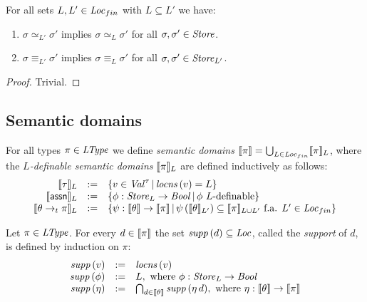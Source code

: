 \documentclass[12pt,a4paper]{report}
\begin{document}
\begin{lemma}
  For all sets $L,L'\in\mathit{Loc}_{fin}$ with $L \subseteq L'$ we have:
  \begin{enumerate}
    \item $\sigma \simeq_{L'} \sigma'$ implies $\sigma \simeq_L \sigma'$ for all $\sigma,\sigma'\in\mathit{Store}$.
    \item $\sigma \equiv_{L'} \sigma'$ implies $\sigma \equiv_L \sigma'$ for all $\sigma,\sigma'\in\mathit{Store}_{L'}$.
  \end{enumerate}
\end{lemma}

\begin{proof}
  Trivial.
\end{proof}



\subsection{Semantic domains}

\begin{definition}
  For all types $\pi \in \mathit{LType}$ we define {\em semantic domains}
  $\llbracket\pi\rrbracket = \bigcup_{L\in\mathit{Loc}_{fin}} \llbracket\pi\rrbracket_L$, where
  the {\em $L$-definable semantic domains} $\llbracket\pi\rrbracket_L$ are defined inductively as follows:
  \[\begin{array}{rcl}
    \llbracket\tau\rrbracket_L &:=& \{v\in\mathit{Val}^\tau\,|\,\mathit{locns}\,(v)=L\} \\
    \llbracket\mathsf{assn}\rrbracket_L &:=& \{\phi:\mathit{Store}_L \to \mathit{Bool}\,|\,\text{$\phi$ $L$-definable}\} \\
    \llbracket\theta\rightarrow_t\pi\rrbracket_L &:=& \{\psi:\llbracket\theta\rrbracket\to\llbracket\pi\rrbracket\,|\,
             \psi\,(\llbracket\theta\rrbracket_{L'}) \subseteq \llbracket\pi\rrbracket_{L \cup L'} \text{ f.a. } L'\in\mathit{Loc}_{fin}\}
  \end{array}\]
\end{definition}

\begin{definition}[Support]
  Let $\pi\in\mathit{LType}$. For every $d \in \llbracket\pi\rrbracket$ the set $\mathit{supp}\,(d)\subseteq\mathit{Loc}$,
  called the {\em support} of $d$, is defined by induction on $\pi$:
  \[\begin{array}{rcl}
    \mathit{supp}\,(v) &:=& \mathit{locns}\,(v) \\
    \mathit{supp}\,(\phi) &:=& L, \text{ where } \phi:\mathit{Store}_L\to\mathit{Bool} \\
    \mathit{supp}\,(\eta) &:=& \bigcap_{d\in\llbracket\theta\rrbracket} \mathit{supp}\,(\eta\,d), \text{ where } \eta:\llbracket\theta\rrbracket\to\llbracket\pi\rrbracket
  \end{array}\]
\end{definition}
\end{document}
